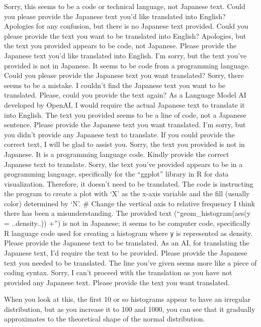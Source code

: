 \documentclass[
  a4paper,
]{book}
\begin{document}
Sorry, this seems to be a code or technical language, not Japanese text.
Could you please provide the Japanese text you'd like translated into
English? Apologies for any confusion, but there is no Japanese text
provided. Could you please provide the text you want to be translated
into English? Apologies, but the text you provided appears to be code,
not Japanese. Please provide the Japanese text you'd like translated
into English. I'm sorry, but the text you've provided is not in
Japanese. It seems to be code from a programming language. Could you
please provide the Japanese text you want translated? Sorry, there seems
to be a mistake. I couldn't find the Japanese text you want to be
translated. Please, could you provide the text again? As a Language
Model AI developed by OpenAI, I would require the actual Japanese text
to translate it into English. The text you provided seems to be a line
of code, not a Japanese sentence. Please provide the Japanese text you
want translated. I'm sorry, but you didn't provide any Japanese text to
translate. If you could provide the correct text, I will be glad to
assist you. Sorry, the text you provided is not in Japanese. It is a
programming language code. Kindly provide the correct Japanese text to
translate. Sorry, the text you've provided appears to be in a
programming language, specifically for the ``ggplot'' library in R for
data visualization. Therefore, it doesn't need to be translated. The
code is instructing the program to create a plot with `X' as the x-axis
variable and the fill (usually color) determined by `N'. \# Change the
vertical axis to relative frequency I think there has been a
misunderstanding. The provided text (``geom\_histogram(aes(y =
..density..)) +'') is not in Japanese; it seems to be computer code,
specifically R language code used for creating a histogram where
\texttt{y} is represented as density. Please provide the Japanese text
to be translated. As an AI, for translating the Japanese text, I'd
require the text to be provided. Please provide the Japanese text you
needed to be translated. The line you've given seems more like a piece
of coding syntax. Sorry, I can't proceed with the translation as you
have not provided any Japanese text. Please provide the text you want
translated.

When you look at this, the first 10 or so histograms appear to have an
irregular distribution, but as you increase it to 100 and 1000, you can
see that it gradually approximates to the theoretical shape of the
normal distribution.
\end{document}
